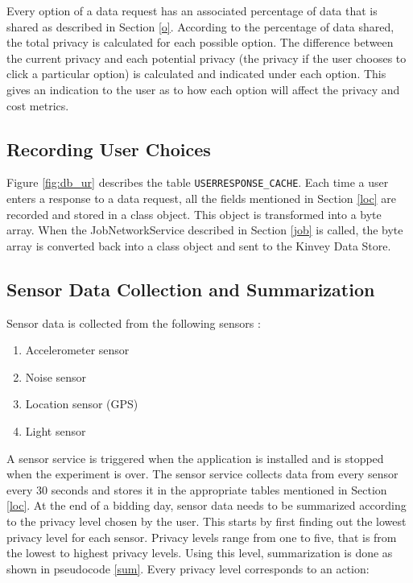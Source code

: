 Every option of a data request has an associated percentage of data that is shared as described in Section \ref{o}. According to the percentage of data shared, the total privacy is calculated for each possible option. The difference between the current privacy and each potential privacy (the privacy if the user chooses to click a particular option) is calculated and indicated under each option. This gives an indication to the user as to how each option will affect the privacy and cost metrics.

\subsection{Recording User Choices}

Figure \ref{fig:db_ur} describes the table \texttt{USERRESPONSE\_CACHE}. Each time a user enters a response to a data request, all the fields mentioned in Section
\ref{loc} are recorded and stored in a class object. This object is transformed into a byte array.
When the JobNetworkService described in Section \ref{job} is called, the byte array is converted back into a class object and sent to the Kinvey Data Store.

\subsection{Sensor Data Collection and Summarization} 

Sensor data is collected from the following sensors :

\begin{enumerate}
	\item Accelerometer sensor
	\item Noise sensor
    \item Location sensor (GPS)
    \item Light sensor
\end{enumerate}

A sensor service is triggered when the application is installed and is stopped when the experiment is over. The sensor service collects data from every sensor
every 30 seconds and stores it in the appropriate tables mentioned in Section \ref{loc}.
At the end of a bidding day, sensor data needs to be summarized according to the privacy level chosen by the user. This starts by first finding out the lowest privacy level for each sensor. Privacy levels range from one to five, that is from the lowest to highest privacy levels. Using this level,
summarization is done as shown in pseudocode \ref{sum}. Every privacy level corresponds to an action:

